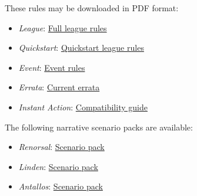 These rules may be downloaded in PDF format:


\begin{itemize}

\item \emph{League}: \href{https://raw.githubusercontent.com/Eudicods/outworlds-wastes/rules-pdf/battletech-outworlds-wastes.pdf}{Full league rules}

\item \emph{Quickstart}: \href{https://raw.githubusercontent.com/Eudicods/outworlds-wastes/rules-pdf/battletech-outworlds-wastes-quickstart.pdf}{Quickstart league rules}

\item \emph{Event}: \href{https://raw.githubusercontent.com/Eudicods/outworlds-wastes/rules-pdf/battletech-outworlds-wastes-event.pdf}{Event rules}

\item \emph{Errata}: \href{https://raw.githubusercontent.com/Eudicods/outworlds-wastes/rules-pdf/battletech-outworlds-wastes-errata.pdf}{Current errata}

\item \emph{Instant Action}: \href{https://raw.githubusercontent.com/Eudicods/outworlds-wastes/rules-pdf/battletech-outworlds-wastes-instant-action.pdf}{Compatibility guide}

\end{itemize}

The following narrative scenario packs are available:

\begin{itemize}

\item \emph{Renorsal}: \href{https://raw.githubusercontent.com/Eudicods/outworlds-wastes/rules-pdf/renorsal.pdf}{Scenario pack}

\item \emph{Linden}: \href{https://raw.githubusercontent.com/Eudicods/outworlds-wastes/rules-pdf/linden.pdf}{Scenario pack}

\item \emph{Antallos}: \href{https://raw.githubusercontent.com/Eudicods/outworlds-wastes/rules-pdf/antallos.pdf}{Scenario pack}

\end{itemize}

